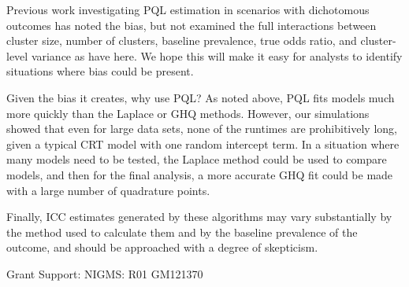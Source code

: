 \documentclass[Afour,times,sagev,doublespace]{sagej}
\begin{document}
Previous work investigating PQL estimation in scenarios with dichotomous outcomes has noted the bias\cite{jang_numerical_2009,zhang_fitting_2011}, but not examined the full interactions between cluster size, number of clusters, baseline prevalence, true odds ratio, and cluster-level variance as have here. We hope this will make it easy for analysts to identify situations where bias could be present.

Given the bias it creates, why use PQL? As noted above, PQL fits models much more quickly than the Laplace or GHQ methods. However, our simulations showed that even for large data sets, none of the runtimes are prohibitively long, given a typical CRT model with one random intercept term. In a situation where many models need to be tested, the Laplace method could be used to compare models, and then for the final analysis, a more accurate GHQ fit could be made with a large number of quadrature points.

Finally, ICC estimates generated by these algorithms may vary substantially by the method used to calculate them and by the baseline prevalence of the outcome, and should be approached with a degree of skepticism.







\begin{funding}
Grant Support: NIGMS: R01 GM121370
\end{funding}
\end{document}
